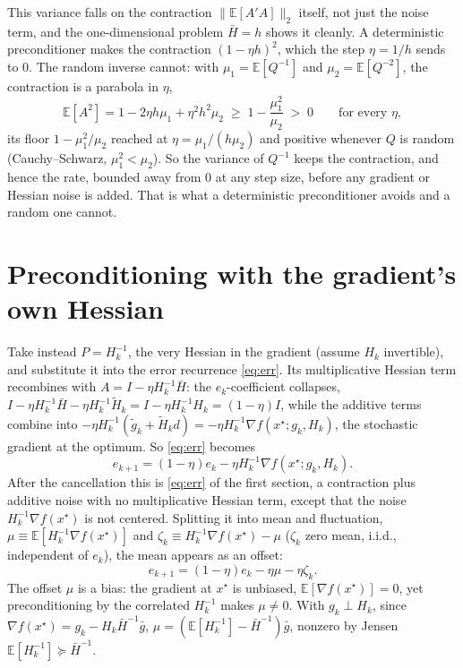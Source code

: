 \documentclass[11pt]{article}
\newcommand{\Hbar}{\bar{H}}
\newcommand{\gbar}{\bar{g}}
\newcommand{\E}{\mathbb{E}}
\begin{document}
This variance falls on the contraction $\|\E[A'A]\|_2$ itself, not just the
noise term, and the one-dimensional problem $\Hbar=h$ shows it cleanly. A
deterministic preconditioner makes the contraction $(1-\eta h)^2$, which the step
$\eta=1/h$ sends to $0$. The random inverse cannot: with $\mu_1=\E[Q^{-1}]$ and
$\mu_2=\E[Q^{-2}]$, the contraction is a parabola in $\eta$,
\[
    \E[A^2]=1-2\eta h\mu_1+\eta^2h^2\mu_2\;\ge\;1-\frac{\mu_1^2}{\mu_2}\;>\;0
    \qquad\text{for every }\eta,
\]
its floor $1-\mu_1^2/\mu_2$ reached at $\eta=\mu_1/(h\mu_2)$ and positive whenever
$Q$ is random (Cauchy--Schwarz, $\mu_1^2<\mu_2$). So the variance of $Q^{-1}$
keeps the contraction, and hence the rate, bounded away from $0$ at any step size,
before any gradient or Hessian noise is added. That is what a deterministic
preconditioner avoids and a random one cannot.


\section{Preconditioning with the gradient's own Hessian}

Take instead $P=H_k^{-1}$, the very Hessian in the gradient (assume $H_k$
invertible), and substitute it into the error recurrence \eqref{eq:err}. Its
multiplicative Hessian term recombines with $A=I-\eta H_k^{-1}\Hbar$: the
$e_k$-coefficient collapses,
$I-\eta H_k^{-1}\Hbar-\eta H_k^{-1}\tilde H_k=I-\eta H_k^{-1}H_k=(1-\eta)I$, while
the additive terms combine into
$-\eta H_k^{-1}(\tilde g_k+\tilde H_k d)=-\eta H_k^{-1}\nabla f(x^\star;g_k,H_k)$,
the stochastic gradient at the optimum. So \eqref{eq:err} becomes
\[
    e_{k+1}=(1-\eta)e_k-\eta H_k^{-1}\nabla f(x^\star;g_k,H_k).
\]
After the cancellation this is \eqref{eq:err} of the first section, a contraction
plus additive noise with no multiplicative Hessian term, except that the noise
$H_k^{-1}\nabla f(x^\star)$ is not centered. Splitting it into mean and
fluctuation, $\mu\equiv\E[H_k^{-1}\nabla f(x^\star)]$ and
$\zeta_k\equiv H_k^{-1}\nabla f(x^\star)-\mu$ ($\zeta_k$ zero mean, i.i.d.,
independent of $e_k$), the mean appears as an offset:
\begin{equation}\label{eq:same}
    e_{k+1}=(1-\eta)e_k-\eta\mu-\eta\zeta_k .
\end{equation}
The offset $\mu$ is a bias: the gradient at $x^\star$ is unbiased,
$\E[\nabla f(x^\star)]=0$, yet preconditioning by the correlated $H_k^{-1}$ makes
$\mu\neq0$. With $g_k\perp H_k$, since $\nabla f(x^\star)=g_k-H_k\Hbar^{-1}\gbar$,
$\mu=(\E[H_k^{-1}]-\Hbar^{-1})\gbar$, nonzero by Jensen $\E[H_k^{-1}]\succeq\Hbar^{-1}$.
\end{document}
